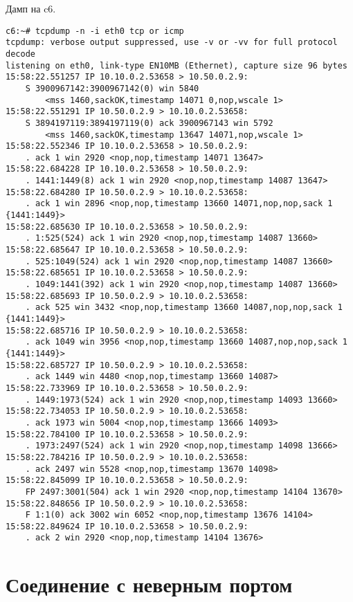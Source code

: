 \documentclass[a4paper,12pt]{article}
\begin{document}
Дамп на c6.

\begin{Verbatim}
c6:~# tcpdump -n -i eth0 tcp or icmp
tcpdump: verbose output suppressed, use -v or -vv for full protocol decode
listening on eth0, link-type EN10MB (Ethernet), capture size 96 bytes
15:58:22.551257 IP 10.10.0.2.53658 > 10.50.0.2.9: 
    S 3900967142:3900967142(0) win 5840 
        <mss 1460,sackOK,timestamp 14071 0,nop,wscale 1>
15:58:22.551291 IP 10.50.0.2.9 > 10.10.0.2.53658: 
    S 3894197119:3894197119(0) ack 3900967143 win 5792 
        <mss 1460,sackOK,timestamp 13647 14071,nop,wscale 1>
15:58:22.552346 IP 10.10.0.2.53658 > 10.50.0.2.9: 
    . ack 1 win 2920 <nop,nop,timestamp 14071 13647>
15:58:22.684228 IP 10.10.0.2.53658 > 10.50.0.2.9: 
    . 1441:1449(8) ack 1 win 2920 <nop,nop,timestamp 14087 13647>
15:58:22.684280 IP 10.50.0.2.9 > 10.10.0.2.53658: 
    . ack 1 win 2896 <nop,nop,timestamp 13660 14071,nop,nop,sack 1 {1441:1449}>
15:58:22.685630 IP 10.10.0.2.53658 > 10.50.0.2.9: 
    . 1:525(524) ack 1 win 2920 <nop,nop,timestamp 14087 13660>
15:58:22.685647 IP 10.10.0.2.53658 > 10.50.0.2.9: 
    . 525:1049(524) ack 1 win 2920 <nop,nop,timestamp 14087 13660>
15:58:22.685651 IP 10.10.0.2.53658 > 10.50.0.2.9: 
    . 1049:1441(392) ack 1 win 2920 <nop,nop,timestamp 14087 13660>
15:58:22.685693 IP 10.50.0.2.9 > 10.10.0.2.53658: 
    . ack 525 win 3432 <nop,nop,timestamp 13660 14087,nop,nop,sack 1 {1441:1449}>
15:58:22.685716 IP 10.50.0.2.9 > 10.10.0.2.53658: 
    . ack 1049 win 3956 <nop,nop,timestamp 13660 14087,nop,nop,sack 1 {1441:1449}>
15:58:22.685727 IP 10.50.0.2.9 > 10.10.0.2.53658: 
    . ack 1449 win 4480 <nop,nop,timestamp 13660 14087>
15:58:22.733969 IP 10.10.0.2.53658 > 10.50.0.2.9: 
    . 1449:1973(524) ack 1 win 2920 <nop,nop,timestamp 14093 13660>
15:58:22.734053 IP 10.50.0.2.9 > 10.10.0.2.53658: 
    . ack 1973 win 5004 <nop,nop,timestamp 13666 14093>
15:58:22.784100 IP 10.10.0.2.53658 > 10.50.0.2.9: 
    . 1973:2497(524) ack 1 win 2920 <nop,nop,timestamp 14098 13666>
15:58:22.784216 IP 10.50.0.2.9 > 10.10.0.2.53658: 
    . ack 2497 win 5528 <nop,nop,timestamp 13670 14098>
15:58:22.845099 IP 10.10.0.2.53658 > 10.50.0.2.9: 
    FP 2497:3001(504) ack 1 win 2920 <nop,nop,timestamp 14104 13670>
15:58:22.848656 IP 10.50.0.2.9 > 10.10.0.2.53658: 
    F 1:1(0) ack 3002 win 6052 <nop,nop,timestamp 13676 14104>
15:58:22.849624 IP 10.10.0.2.53658 > 10.50.0.2.9: 
    . ack 2 win 2920 <nop,nop,timestamp 14104 13676>
\end{Verbatim}

\section{Соединение с неверным портом}
\end{document}
